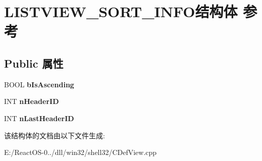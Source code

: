 \hypertarget{struct_l_i_s_t_v_i_e_w___s_o_r_t___i_n_f_o}{}\section{L\+I\+S\+T\+V\+I\+E\+W\+\_\+\+S\+O\+R\+T\+\_\+\+I\+N\+F\+O结构体 参考}
\label{struct_l_i_s_t_v_i_e_w___s_o_r_t___i_n_f_o}
\subsection*{Public 属性}
\begin{DoxyCompactItemize}
\item 
\mbox{\label{struct_l_i_s_t_v_i_e_w___s_o_r_t___i_n_f_o_a6ff530457ada7c129fa258d02050b6c6}} 
B\+O\+OL {\bfseries b\+Is\+Ascending}
\item 
\mbox{\label{struct_l_i_s_t_v_i_e_w___s_o_r_t___i_n_f_o_ac62c2b42e5d01ae876b317b58f752d42}} 
I\+NT {\bfseries n\+Header\+ID}
\item 
\mbox{\label{struct_l_i_s_t_v_i_e_w___s_o_r_t___i_n_f_o_a4d3583371dbcaf498f081ef050d3291d}} 
I\+NT {\bfseries n\+Last\+Header\+ID}
\end{DoxyCompactItemize}


该结构体的文档由以下文件生成\+:\begin{DoxyCompactItemize}
\item 
E\+:/\+React\+O\+S-\/0../dll/win32/shell32/C\+Def\+View.\+cpp\end{DoxyCompactItemize}
